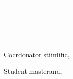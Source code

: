 \begin{titlepage}
  \oddsidemargin=\evensidemargin\relax
  \textwidth=\dimexpr{}\evensidemargin-2in\relax
  \hsize=\textwidth\relax

  \centering


  \vspace{5mm}
  {\LARGE{\getUniversity{}}}\\
  
  \vspace{5mm}
  {\LARGE{\getFaculty{}}}\\
  
  \vspace{5mm}
  {\LARGE{\getDepartment{}}}\\

  \vfill
  {\huge\bfseries \getDoctype}

  \vfill
  \begin{flushleft}
  {\large Coordonator stiintific,}\\
  {\large \getAdvisor{}}
  \end{flushleft}

  \vspace{5mm}
  \begin{flushright}
  {\large Student masterand,}\\
  {\large \getAuthor{}}
  \end{flushright}


  \vfill
  {\huge{\getSubmissionLocation{}}}\\
  
  \vspace{5mm}
  {\huge\MakeUppercase{\getSubmissionDate}{}}\\

\end{titlepage}
